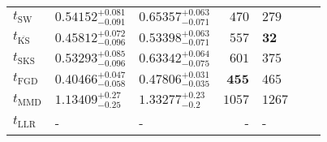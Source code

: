 \begin{tabular}{l|llr|llr}
	\midrule
	$t_{\mathrm{SW}}$ & $0.54152_{-0.091}^{+0.081}$ & $0.65357_{-0.071}^{+0.063}$ & $470$ & $279$ \\
	$t_{\overline{\mathrm{KS}}}$ & $0.45812_{-0.096}^{+0.072}$ & $0.53398_{-0.071}^{+0.063}$ & $557$ & ${\mathbf{32}}$ \\
	$t_{\mathrm{SKS}}$ & $0.53293_{-0.096}^{+0.085}$ & $0.63342_{-0.075}^{+0.064}$ & $601$ & $375$ \\
	$t_{\mathrm{FGD}}$ & ${\mathbf{0.40466_{-0.058}^{+0.047}}}$ & ${\mathbf{0.47806_{-0.035}^{+0.031}}}$ & ${\mathbf{455}}$ & $465$ \\
	$t_{\mathrm{MMD}}$ & $1.13409_{-0.25}^{+0.27}$ & $1.33277_{-0.2}^{+0.23}$ & $1057$ & $1267$ \\
	$t_{\mathrm{LLR}}$ & - & - & - & - \\
	\bottomrule
\end{tabular}